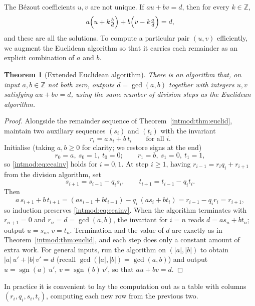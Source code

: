 \documentclass[11pt,a4paper]{article}
\newtheorem{theorem}{Theorem}[section]
\theoremstyle{definition}
\theoremstyle{remark}
\newcommand{\Z}{\ensuremath{\mathbb{Z}}}
\DeclareMathOperator{\sgn}{sgn}
\begin{document}
The Bézout coefficients \(u,v\) are not unique. If \(au+bv=d\), then for every \(k\in\Z\),
\[
a\Bigl(u+k\tfrac{b}{d}\Bigr)+b\Bigl(v-k\tfrac{a}{d}\Bigr)=d,
\]
and these are all the solutions. To compute a particular pair \((u,v)\) efficiently, we augment the Euclidean algorithm so that it carries each remainder as an explicit combination of \(a\) and \(b\).

\begin{theorem}[Extended Euclidean algorithm]\label{intmod:thm:exteuclid}
There is an algorithm that, on input \(a,b\in\Z\) not both zero, outputs \(d=\gcd(a,b)\) together with integers \(u,v\) satisfying \(au+bv=d\), using the same number of division steps as the Euclidean algorithm.
\end{theorem}

\begin{proof}
Alongside the remainder sequence of Theorem~\ref{intmod:thm:euclid}, maintain two auxiliary sequences \((s_i)\) and \((t_i)\) with the invariant
\[
r_i = a\,s_i + b\,t_i \qquad\text{for all } i. \tag{\(\ast\)}\label{intmod:eq:eeainv}
\]
Initialise (taking \(a,b\ge 0\) for clarity; we restore signs at the end)
\[
r_0=a,\ s_0=1,\ t_0=0; \qquad r_1=b,\ s_1=0,\ t_1=1,
\]
so \eqref{intmod:eq:eeainv} holds for \(i=0,1\). At step \(i\ge 1\), having \(r_{i-1}=r_i q_i + r_{i+1}\) from the division algorithm, set
\[
s_{i+1}=s_{i-1}-q_i s_i, \qquad t_{i+1}=t_{i-1}-q_i t_i.
\]
Then
\[
a\,s_{i+1}+b\,t_{i+1} = (a s_{i-1}+b t_{i-1}) - q_i\,(a s_i + b t_i) = r_{i-1}-q_i r_i = r_{i+1},
\]
so induction preserves \eqref{intmod:eq:eeainv}. When the algorithm terminates with \(r_{n+1}=0\) and \(r_n=d=\gcd(a,b)\), the invariant for \(i=n\) reads \(d=a s_n + b t_n\); output \(u=s_n\), \(v=t_n\). Termination and the value of \(d\) are exactly as in Theorem~\ref{intmod:thm:euclid}, and each step does only a constant amount of extra work. For general inputs, run the algorithm on \((|a|,|b|)\) to obtain \(|a|\,u' + |b|\,v' = d\) (recall \(\gcd(|a|,|b|) = \gcd(a,b)\)) and output \(u = \sgn(a)\,u'\), \(v = \sgn(b)\,v'\), so that \(au + bv = d\).
\end{proof}

In practice it is convenient to lay the computation out as a table with columns \((r_i,q_i,s_i,t_i)\), computing each new row from the previous two.
\end{document}
